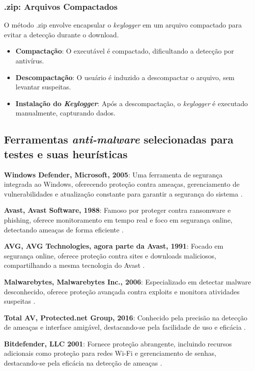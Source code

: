 \documentclass[12pt]{article}
\begin{document}
\subsubsection{.zip: Arquivos Compactados}

O método .zip envolve encapsular o \textit{keylogger} em um arquivo compactado para evitar a detecção durante o download.

\begin{itemize}
    \item \textbf{Compactação}: O executável é compactado, dificultando a detecção por antivírus.
    \item \textbf{Descompactação}: O usuário é induzido a descompactar o arquivo, sem levantar suspeitas.
    \item \textbf{Instalação do \textit{Keylogger}}: Após a descompactação, o \textit{keylogger} é executado manualmente, capturando dados.
\end{itemize}

\subsection{Ferramentas \textit{anti-malware} selecionadas para testes e suas heurísticas}

\textbf{Windows Defender, Microsoft, 2005}: Uma ferramenta de segurança integrada ao Windows, oferecendo proteção contra ameaças, gerenciamento de vulnerabilidades e atualização constante para garantir a segurança do sistema \citep{MicrosoftSecurityBlog}.

\textbf{Avast, Avast Software, 1988}: Famoso por proteger contra ransomware e phishing, oferece monitoramento em tempo real e foco em segurança online, detectando ameaças de forma eficiente \citep{Avast}.

\textbf{AVG, AVG Technologies, agora parte da Avast, 1991}: Focado em segurança online, oferece proteção contra sites e downloads maliciosos, compartilhando a mesma tecnologia do Avast \citep{AVG}.

\textbf{Malwarebytes, Malwarebytes Inc., 2006}: Especializado em detectar malware desconhecido, oferece proteção avançada contra exploits e monitora atividades suspeitas \citep{Malwarebytes}.

\textbf{Total AV, Protected.net Group, 2016}: Conhecido pela precisão na detecção de ameaças e interface amigável, destacando-se pela facilidade de uso e eficácia \citep{TotalAV}.

\textbf{Bitdefender, LLC 2001}: Fornece proteção abrangente, incluindo recursos adicionais como proteção para redes Wi-Fi e gerenciamento de senhas, destacando-se pela eficácia na detecção de ameaças \citep{Bitdefender}.
\end{document}
